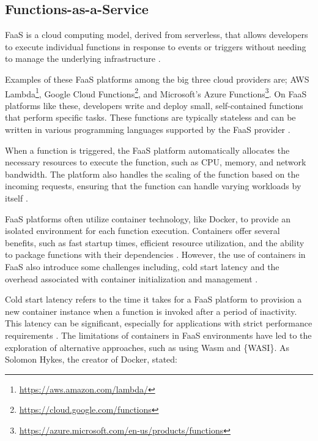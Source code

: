 \documentclass[
  table]{report}
\begin{document}
\subsection{Functions-as-a-Service}

\ac{FaaS} is a cloud computing model, derived from serverless, that
allows developers to execute individual functions in response to events
or triggers without needing to manage the underlying infrastructure
\citep{sewakWinningEraServerless2018}.

Examples of these \ac{FaaS} platforms among the big three cloud
providers are; \ac{AWS} Lambda\footnote{\url{https://aws.amazon.com/lambda/}},
Google Cloud Functions\footnote{\url{https://cloud.google.com/functions}},
and Microsoft's Azure Functions\footnote{\url{https://azure.microsoft.com/en-us/products/functions}}.
On FaaS platforms like these, developers write and deploy small,
self-contained functions that perform specific tasks. These functions
are typically stateless and can be written in various programming
languages supported by the FaaS provider
\citep{baldiniServerlessComputingCurrent2017}.

When a function is triggered, the FaaS platform automatically allocates
the necessary resources to execute the function, such as CPU, memory,
and network bandwidth. The platform also handles the scaling of the
function based on the incoming requests, ensuring that the function can
handle varying workloads by itself
\citep{mcgrathServerlessComputingDesign2017}.

FaaS platforms often utilize container technology, like Docker, to
provide an isolated environment for each function execution. Containers
offer several benefits, such as fast startup times, efficient resource
utilization, and the ability to package functions with their
dependencies \citep{vaneykServerlessMorePaaS2018}. However, the use of
containers in FaaS also introduce some challenges including, cold start
latency and the overhead associated with container initialization and
management \citep{wangPeekingCurtainsServerless2018}.

Cold start latency refers to the time it takes for a FaaS platform to
provision a new container instance when a function is invoked after a
period of inactivity. This latency can be significant, especially for
applications with strict performance requirements
\citep{wangPeekingCurtainsServerless2018}. The limitations of containers
in FaaS environments have led to the exploration of alternative
approaches, such as using \ac{Wasm} and \{WASI\}. As Solomon Hykes, the
creator of Docker, stated:
\end{document}
